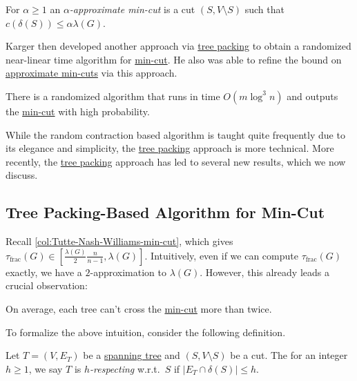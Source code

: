 \begin{definition}\label{def:approximate-min-cut}
	For \(\alpha \geq 1\) an \emph{\(\alpha \)-approximate min-cut} is a cut \((S, V \setminus S)\) such that \(c(\delta (S)) \leq \alpha \lambda (G)\).
\end{definition}

Karger then developed another approach via \hyperref[prb:tree-packing]{tree packing} to obtain a randomized near-linear time algorithm for \hyperref[prb:global-min-cut]{min-cut}. He also was able to refine the bound on \hyperref[thm:number-approximate-min-cut]{approximate min-cuts} via this approach.

\begin{theorem}\label{thm:Karger-tree-packing-based-min-cut}
	There is a randomized algorithm that runs in time \(O(m \log ^3 n)\) and outputs the \hyperref[prb:global-min-cut]{min-cut} with high probability.
\end{theorem}

While the random contraction based algorithm is taught quite frequently due to its elegance and simplicity, the \hyperref[prb:tree-packing]{tree packing} approach is more technical. More recently, the \hyperref[prb:tree-packing]{tree packing} approach has led to several new results, which we now discuss.

\subsection{Tree Packing-Based Algorithm for Min-Cut}
Recall \autoref{col:Tutte-Nash-Williams-min-cut}, which gives \(\tau _{\text{frac} }(G) \in [\frac{\lambda (G)}{2} \frac{n}{n-1}, \lambda (G)]\). Intuitively, even if we can compute \(\tau _{\text{frac} }(G)\) exactly, we have a \(2\)-approximation to \(\lambda (G)\). However, this already leads a crucial observation:

\begin{intuition}
	On average, each tree can't cross the \hyperref[prb:global-min-cut]{min-cut} more than twice.
\end{intuition}

To formalize the above intuition, consider the following definition.

\begin{definition}[Respecting]\label{def:respect}
	Let \(T = (V, E_T)\) be a \hyperref[def:spanning-tree]{spanning tree} and \((S, V\setminus S)\) be a cut. The for an integer \(h \geq 1\), we say \(T\) is \emph{\(h\)-respecting} w.r.t.\ \(S\) if \(\lvert E_T \cap \delta (S) \rvert \leq h\).
\end{definition}

